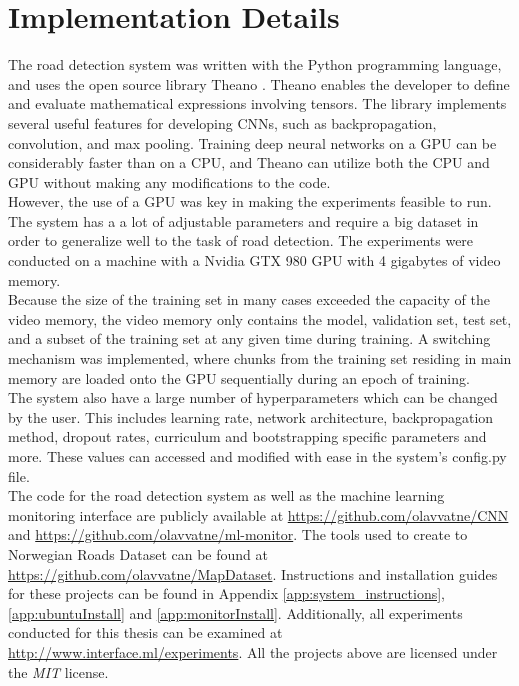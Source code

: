 \section{Implementation Details}
\label{sec:methods_implementation_details}
The road detection system was written with the Python programming language, and uses the open source library Theano \citep{bergstra_theano}. Theano enables the developer to define and evaluate mathematical expressions involving tensors. The library implements several useful features for developing \ac{CNN}s, such as backpropagation, convolution, and max pooling. Training deep neural networks on a \ac{GPU} can be considerably faster than on a \ac{CPU}, and Theano can utilize both the \ac{CPU} and \ac{GPU} without making any modifications to the code.\\

However, the use of a \ac{GPU} was key in making the experiments feasible to run. The system has a a lot of adjustable parameters and require a big dataset in order to generalize well to the task of road detection. The experiments were conducted on a machine with a Nvidia GTX 980 \ac{GPU} with 4 gigabytes of video memory. \\

Because the size of the training set in many cases exceeded the capacity of the video memory, the video memory only contains the model, validation set, test set, and a subset of the training set at any given time during training. A switching mechanism was implemented, where chunks from the training set residing in main memory are loaded onto the \ac{GPU} sequentially during an epoch of training.\\

The system also have a large number of hyperparameters which can be changed by the user. This includes learning rate, network architecture, backpropagation method, dropout rates, curriculum and bootstrapping specific parameters and more. These values can accessed and modified with ease in the system's config.py file. \\

The code for the road detection system as well as the machine learning monitoring interface are publicly available at 
\url{https://github.com/olavvatne/CNN} and \url{https://github.com/olavvatne/ml-monitor}. The tools used to create to Norwegian Roads Dataset can be found at \url{https://github.com/olavvatne/MapDataset}. Instructions and installation guides for these projects can be found in Appendix \ref{app:system_instructions}, \ref{app:ubuntuInstall} and \ref{app:monitorInstall}. Additionally, all experiments conducted for this thesis can be examined at \url{http://www.interface.ml/experiments}. All the projects above are licensed under the \emph{MIT} license.

